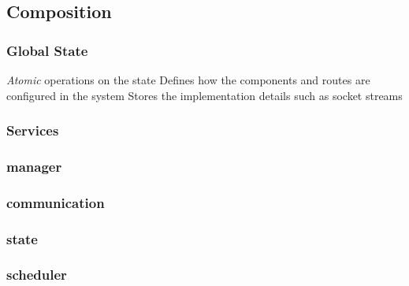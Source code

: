 \subsection{Composition}

\subsubsection{Global State}
\textit{Atomic} operations on the state
Defines how the components and routes are configured in the system
Stores the implementation details such as socket streams


\subsubsection{Services}

\subsubsection{manager}

\subsubsection{communication}

\subsubsection{state}

\subsubsection{scheduler}





